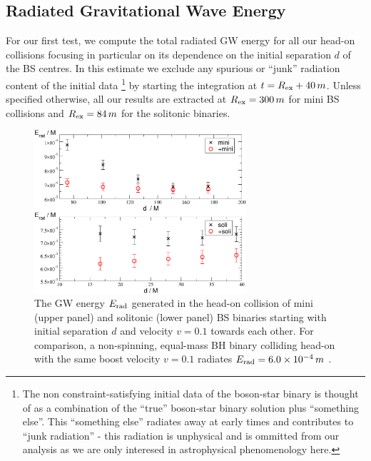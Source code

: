 \subsection{Radiated Gravitational Wave Energy}
%
For our first test, we compute the total radiated
GW energy for all our head-on collisions focusing
in particular on its dependence on the initial separation
$d$ of the BS centres. In this estimate we exclude
any spurious or ``junk'' radiation content
of the initial data
\footnote{\color{orchid}
The non constraint-satisfying initial data of the boson-star binary is thought of as a
combination of the \enquote{true} boson-star binary solution plus \enquote{something else}.
This \enquote{something else} radiates away at early
times and contributes to \enquote{junk radiation} - this radiation is unphysical
and is ommitted from our analysis as we are only interesed in astrophysical
phenomenology here.
\color{black}}
by starting the integration
at $t=R_{\rm ex}+40\,m$. Unless specified otherwise,
all our results are extracted at $R_{\rm ex}=300\,m$ for
mini BS collisions and $R_{\rm ex}=84\,m$ for the
solitonic binaries.
%
\begin{figure}
    \centering
    \includegraphics[width=0.7\textwidth]{malaise_source/erad.pdf}
    \caption{The GW energy $E_{\rm rad}$ generated in
    the head-on collision of mini (upper panel) and solitonic (lower panel) BS binaries starting
    with initial separation $d$ and velocity $v=0.1$ towards
    each other.
    For comparison, a non-spinning, equal-mass BH binary
    colliding head-on with the same boost velocity $v=0.1$ radiates $E_{\rm rad}=6.0\times 10^{-4}\,m$
    \cite{Sperhake:2019oaw}.
    }
    \label{mal:fig:erad}
\end{figure}
%

